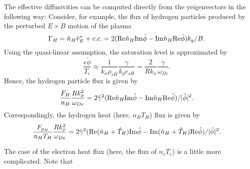 The effective diffusivities can be computed directly from the 
yeigenvectors in the following way:
Consider, for example, the flux of hydrogen particles produced by
the perturbed $ E \times B $ motion of the plasma
\[ \Gamma_H = \tilde{n}_H \tilde{v}_E^* + c.c. 
 = 2 ( {\rm Re} \tilde{n}_H {\rm Im} \tilde{\phi}
     - {\rm Im} \tilde{n}_H {\rm Re} \tilde{\phi} ) k_y / B. \]
Using the quasi-linear assumption, the saturation level is 
approximated by
\[ \frac{e \tilde{\phi}}{T_e}
 \approx \frac{1}{k_x \rho_{sH}} \frac{ \gamma }{ k_y c_{sH} }
 = \frac{2}{R k_x} \frac{\gamma}{\omega_{De}}. \]
Hence, the hydrogen particle flux is given by
\[ \frac{ F_H }{ n_H } \frac{ R k_x^2 }{ \omega_{De} }
  = 2 \hat{\gamma}^2
  ( {\rm Re} \hat{n}_H {\rm Im} \hat{\phi}
  - {\rm Im} \hat{n}_H {\rm Re} \hat{\phi} ) / | \hat{\phi} |^2.
   \]
Correspondingly, the hydrogen heat (here, $ n_H T_H $) flux is given by
\[ \frac{ F_{p_H} }{ n_H T_H } \frac{ R k_x^2 }{ \omega_{De} }
  = 2 \hat{\gamma}^2
  ( {\rm Re} ( \hat{n}_H + \hat{T}_H ) {\rm Im} \hat{\phi}
  - {\rm Im} ( \hat{n}_H + \hat{T}_H ) {\rm Re} \hat{\phi} )
    / | \hat{\phi} |^2.
   \]

The case of the electron heat flux (here, the flux of $ n_e T_e $)
is a little more complicated.  Note that

